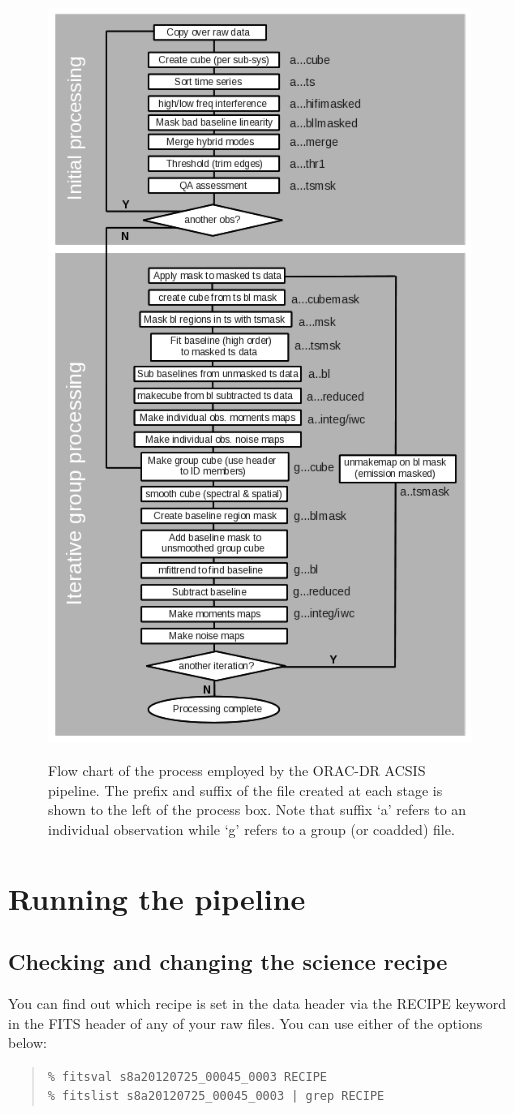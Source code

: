 \documentclass[twoside,11pt]{article}
\newcommand{\xlabel}[1]{}
\renewcommand{\_}{\texttt{\symbol{95}}}
\newenvironment{myquote}{
   \color{MidnightBlue}\begin{quote}\begin{small}}{
   \end{small}\end{quote}
}
\renewenvironment{myquote}{
      \begin{quote}\begin{small}}{
      \end{small}\end{quote}
   }
\begin{document}
\setlength{\intextsep}{10.0pt plus 1.0pt minus 2.0pt}
\begin{figure}[h!]
\begin{center}
\includegraphics[width=0.55\linewidth]{sc20_pipeline}
\label{fig:pipeline}
\caption[Flow chart of the ORAC-DR ACSIS pipeline process.]{Flow chart of the process employed by the ORAC-DR ACSIS pipeline. The prefix and suffix of the file created at each stage is shown to the left of the process box. Note that suffix `a' refers to an individual observation while `g' refers to a group (or coadded) file.}
\end{center}
\end{figure}
\setlength{\textfloatsep}{20pt plus 1.0pt minus 2.0pt}

\clearpage
\section{\xlabel{running_pl}Running the pipeline}
\label{sec:runpipe}

\subsection{Checking and changing the science recipe}
\label{sec:changerecipe}
You can find out which recipe is set in the data header via the RECIPE keyword in the FITS header of any of your raw files.  You can use either of the options below:
\begin{myquote}
\begin{verbatim}
% fitsval s8a20120725_00045_0003 RECIPE
% fitslist s8a20120725_00045_0003 | grep RECIPE
\end{verbatim}
\end{myquote}
\end{document}
